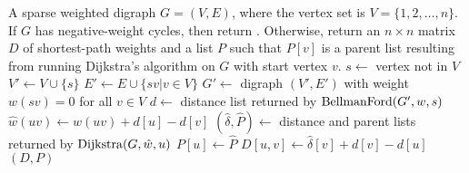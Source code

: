 
\begin{algorithmic}[1]
\Require A sparse weighted digraph $G = (V, E)$, where the vertex set is
  $V = \{1, 2, \dots, n\}$.
\Ensure If $G$ has negative-weight cycles, then return
  \MyFalse. Otherwise, return an $n \times n$ matrix $D$ of shortest-path
  weights and a list $P$ such that $P[v]$ is a parent list resulting
  from running Dijkstra's algorithm on $G$ with start vertex $v$.
\State $s \gets$ vertex not in $V$
\State $V' \gets V \cup \{s\}$
\State $E' \gets E \cup \{sv | v \in V\}$
\State $G' \gets$ digraph $(V', E')$ with weight $w(sv) = 0$ for all $v \in V$
  \State \Return \MyFalse
\EndIf
\State $d \gets$ distance list returned by $\operatorname*{BellmanFord}(G', w, s)$
  \State $\hat{w}(uv) \gets w(uv) + d[u] - d[v]$
\EndFor
{}
  \State $(\hat{\delta}, \hat{P}) \gets$ distance and parent lists returned by $\operatorname*{Dijkstra}(G, \hat{w}, u)$
  \State $P[u] \gets \hat{P}$
    \State $D[u,v] \gets \hat{\delta}[v] + d[v] - d[u]$
  \EndFor
\EndFor
\State \Return $(D, P)$
\end{algorithmic}
